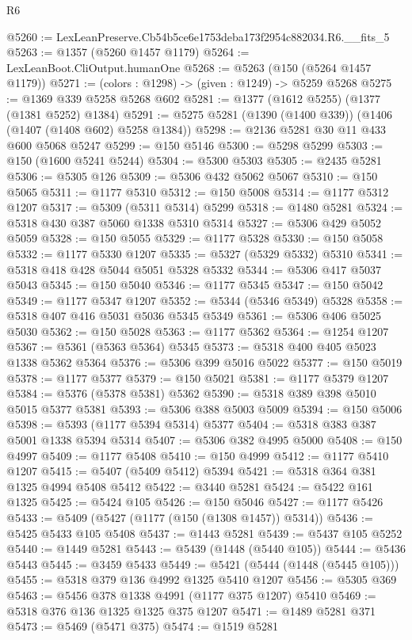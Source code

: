 \begin{lexlean}{R6}
\begin{coremodule}
@5260 := LexLeanPreserve.Cb54b5ce6e1753deba173f2954c882034.R6.__fits_5
@5263 := @1357 (@5260 @1457 @1179)
@5264 := LexLeanBoot.CliOutput.humanOne
@5268 := @5263 (@150 (@5264 @1457 @1179))
@5271 := (colors : @1298) -> (given : @1249) -> @5259 @5268
@5275 := @1369 @339 @5258 @5268 @602
@5281 := @1377 (@1612 @5255) (@1377 (@1381 @5252) @1384)
@5291 := @5275 @5281 (@1390 (@1400 @339)) (@1406 (@1407 (@1408 @602) @5258 @1384))
@5298 := @2136 @5281 @30 @11 @433 @600 @5068 @5247
@5299 := @150 @5146
@5300 := @5298 @5299
@5303 := @150 (@1600 @5241 @5244)
@5304 := @5300 @5303
@5305 := @2435 @5281
@5306 := @5305 @126
@5309 := @5306 @432 @5062 @5067
@5310 := @150 @5065
@5311 := @1177 @5310
@5312 := @150 @5008
@5314 := @1177 @5312 @1207
@5317 := @5309 (@5311 @5314) @5299
@5318 := @1480 @5281
@5324 := @5318 @430 @387 @5060 @1338 @5310 @5314
@5327 := @5306 @429 @5052 @5059
@5328 := @150 @5055
@5329 := @1177 @5328
@5330 := @150 @5058
@5332 := @1177 @5330 @1207
@5335 := @5327 (@5329 @5332) @5310
@5341 := @5318 @418 @428 @5044 @5051 @5328 @5332
@5344 := @5306 @417 @5037 @5043
@5345 := @150 @5040
@5346 := @1177 @5345
@5347 := @150 @5042
@5349 := @1177 @5347 @1207
@5352 := @5344 (@5346 @5349) @5328
@5358 := @5318 @407 @416 @5031 @5036 @5345 @5349
@5361 := @5306 @406 @5025 @5030
@5362 := @150 @5028
@5363 := @1177 @5362
@5364 := @1254 @1207
@5367 := @5361 (@5363 @5364) @5345
@5373 := @5318 @400 @405 @5023 @1338 @5362 @5364
@5376 := @5306 @399 @5016 @5022
@5377 := @150 @5019
@5378 := @1177 @5377
@5379 := @150 @5021
@5381 := @1177 @5379 @1207
@5384 := @5376 (@5378 @5381) @5362
@5390 := @5318 @389 @398 @5010 @5015 @5377 @5381
@5393 := @5306 @388 @5003 @5009
@5394 := @150 @5006
@5398 := @5393 (@1177 @5394 @5314) @5377
@5404 := @5318 @383 @387 @5001 @1338 @5394 @5314
@5407 := @5306 @382 @4995 @5000
@5408 := @150 @4997
@5409 := @1177 @5408
@5410 := @150 @4999
@5412 := @1177 @5410 @1207
@5415 := @5407 (@5409 @5412) @5394
@5421 := @5318 @364 @381 @1325 @4994 @5408 @5412
@5422 := @3440 @5281
@5424 := @5422 @161 @1325
@5425 := @5424 @105
@5426 := @150 @5046
@5427 := @1177 @5426
@5433 := @5409 (@5427 (@1177 (@150 (@1308 @1457)) @5314))
@5436 := @5425 @5433 @105 @5408
@5437 := @1443 @5281
@5439 := @5437 @105 @5252
@5440 := @1449 @5281
@5443 := @5439 (@1448 (@5440 @105))
@5444 := @5436 @5443
@5445 := @3459 @5433
@5449 := @5421 (@5444 (@1448 (@5445 @105)))
@5455 := @5318 @379 @136 @4992 @1325 @5410 @1207
@5456 := @5305 @369
@5463 := @5456 @378 @1338 @4991 (@1177 @375 @1207) @5410
@5469 := @5318 @376 @136 @1325 @1325 @375 @1207
@5471 := @1489 @5281 @371
@5473 := @5469 (@5471 @375)
@5474 := @1519 @5281

\end{coremodule}
\end{lexlean}
